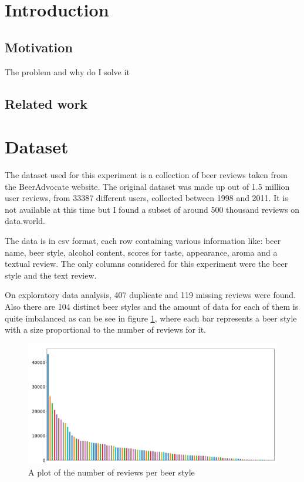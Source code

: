 \documentclass[12pt]{article}
\begin{document}
	\title{}
	\author{Stefan Sebastian, 242}
	\date{}
	\maketitle
	
	\begin{abstract}
	
	\end{abstract}

	\newpage
	\tableofcontents
	\newpage
	
	\section{Introduction}
	\subsection{Motivation}
	The problem and why do I solve it
	\subsection{Related work}
	
	\section{Dataset}
	The dataset used for this experiment is a collection of beer reviews taken from the BeerAdvocate website. The original dataset was made up out of 1.5 million user reviews, from 33387 different users, collected between 1998 and 2011. It is not available at this time but I found a subset of around 500 thousand reviews on data.world\cite{BeerAdvocateData}. 
	
	The data is in csv format, each row containing various information like: beer name, beer style, alcohol content, scores for taste, appearance, aroma and a textual review. The only columns considered for this experiment were the beer style and the text review.
	
	On exploratory data analysis, 407 duplicate and 119 missing reviews were found. Also there are 104 distinct beer styles and the amount of data for each of them is quite imbalanced as can be see in figure \ref{fig:initialDistribution}, where each bar represents a beer style with a size proportional to the number of reviews for it.
	
	\begin{figure}
		\includegraphics[width=\linewidth]{resources/InitialDistribution.png}
		\caption{A plot of the number of reviews per beer style}
		\label{fig:initialDistribution}
	\end{figure}
\end{document}
